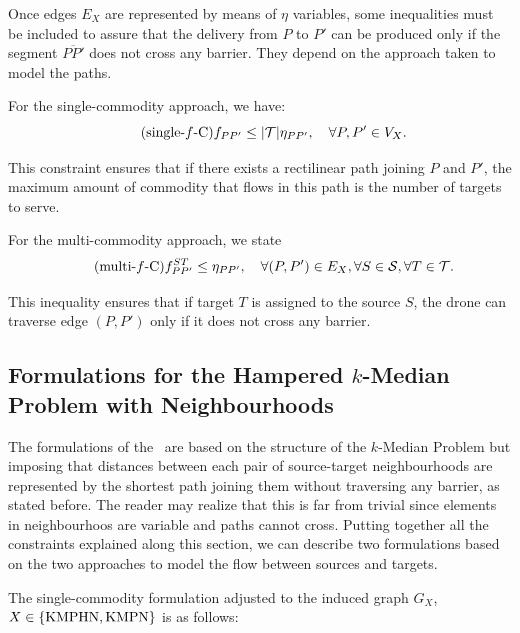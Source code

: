 \documentclass[a4paper,  review, authoryear, 1p.]{elsarticle}
\newcommand{\KMPHN}{{\sf{H-KMPHN}}}
\newcommand{\KMPN}{{\sf{H-KMPN}\xspace }}
\newcommand{\JP}[1]{{\color{armygreen}#1}}
\newcommand{\CV}[1]{{\color{blue}#1}}
\newcommand{\segment}[2]{\overline{#1#2}}
\begin{document}
	\CV{
		Once edges $E_X$ are represented by means of $\eta$ variables, some inequalities must be included to assure that the delivery from $P$ to $P'$ can be produced only if the segment $\segment{P}{P'}$ does not cross any barrier. They depend on the approach taken to model the paths.
		
		For the single-commodity approach, we have:
		\begin{equation*}\tag{single-$f$-C}\label{eq:single-fC}
			f_{PP'}\leq  |\mathcal T|\eta_{PP'},\quad\forall P, P'\in V_X.
		\end{equation*}
		
		This constraint ensures that if there exists a rectilinear path joining $P$ and $P'$, the maximum amount of commodity that flows in this path is the number of targets to serve.
		
		For the multi-commodity approach, we state
		\begin{equation*}\tag{multi-$f$-C}\label{eq:multi-fC}
			f_{PP'}^{ST}\leq  \eta_{PP'},\quad\forall (P, P')\in E_X, \forall S\in\mathcal S, \forall T\in\mathcal T.
		\end{equation*}
	
		This inequality ensures that if target $T$ is assigned to the source $S$, the drone can traverse edge $(P, P')$ only if it does not cross any barrier.}
	
 
		
	\subsection{Formulations for the Hampered $k$-Median Problem with Neighbourhoods}\label{ssec:KMPHN}
	
	\CV{The formulations of the \KMPN \ are based on the structure of the  $k$-Median Problem but imposing that distances between each pair of source-target neighbourhoods are represented by the shortest path joining them without traversing any barrier, as stated before. \JP{The reader may realize that this is far from trivial since elements in neighbourhoos are variable and paths cannot cross.} Putting together all the constraints explained along this section, we can describe two formulations based on the two approaches to model the flow between sources and targets. 
		
	The single-commodity formulation adjusted to the induced graph $G_X$, $X\in \{\rm KMPHN, \rm KMPN\}$ is as follows:}
	
	
	\newcommand{\xvar}[2]{x(#1#2)}
\end{document}
